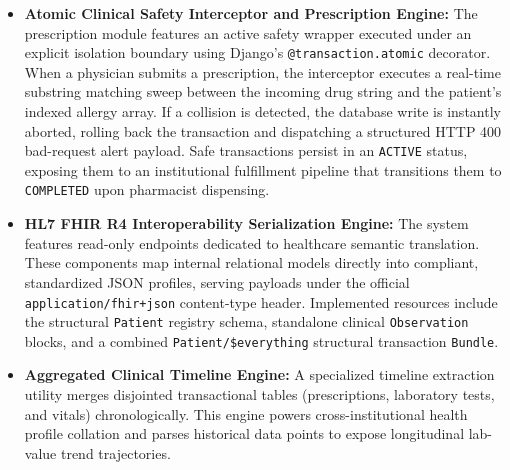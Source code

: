 \documentclass[12pt, a4paper]{report}
\numberwithin{equation}{chapter}
\begin{document}
\begin{itemize}
    \begin{itemize}
        \item \textit{Hemoglobin} (LOINC: \texttt{718-7}), bound to precise reference ranges and SI units.
        \item \textit{White Blood Cell Count (WBC)} (LOINC: \texttt{6690-2}), with integrated validation boundaries.
        \item \textit{Platelets} (LOINC: \texttt{777-3}), equipped with mathematical threshold triggers.
    \end{itemize}
    \item \textbf{Atomic Clinical Safety Interceptor and Prescription Engine:} The prescription module features an active safety wrapper executed under an explicit isolation boundary using Django's \texttt{@transaction.atomic} decorator. When a physician submits a prescription, the interceptor executes a real-time substring matching sweep between the incoming drug string and the patient's indexed allergy array. If a collision is detected, the database write is instantly aborted, rolling back the transaction and dispatching a structured HTTP 400 bad-request alert payload. Safe transactions persist in an \texttt{ACTIVE} status, exposing them to an institutional fulfillment pipeline that transitions them to \texttt{COMPLETED} upon pharmacist dispensing.
    \item \textbf{HL7 FHIR R4 Interoperability Serialization Engine:} The system features read-only endpoints dedicated to healthcare semantic translation. These components map internal relational models directly into compliant, standardized JSON profiles, serving payloads under the official \texttt{application/fhir+json} content-type header. Implemented resources include the structural \texttt{Patient} registry schema, standalone clinical \texttt{Observation} blocks, and a combined \texttt{Patient/\$everything} structural transaction \texttt{Bundle}.
    \item \textbf{Aggregated Clinical Timeline Engine:} A specialized timeline extraction utility merges disjointed transactional tables (prescriptions, laboratory tests, and vitals) chronologically. This engine powers cross-institutional health profile collation and parses historical data points to expose longitudinal lab-value trend trajectories.
\end{itemize}
\end{document}
